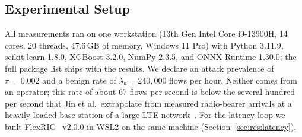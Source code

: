 \subsection{Experimental Setup}
\label{sec:setup}

All measurements ran on one workstation (13th Gen Intel Core i9-13900H, 14 cores, 20 threads, 47.6\,GB of memory, Windows 11 Pro) with Python 3.11.9, scikit-learn 1.8.0, XGBoost 3.2.0, NumPy 2.3.5, and ONNX Runtime 1.30.0; the full package list ships with the results. We declare an attack prevalence of $\pi = 0.002$ and a benign rate of $\lambda_{b} = 240{,}000$ flows per hour. Neither comes from an operator; this rate of about 67 flows per second is below the several hundred per second that Jin et al.\ extrapolate from measured radio-bearer arrivals at a heavily loaded base station of a large LTE network~\cite{jin2013softcell}. For the latency loop we built FlexRIC~\cite{schmidt2021flexric} v2.0.0 in WSL2 on the same machine (Section~\ref{sec:res:latency}).






